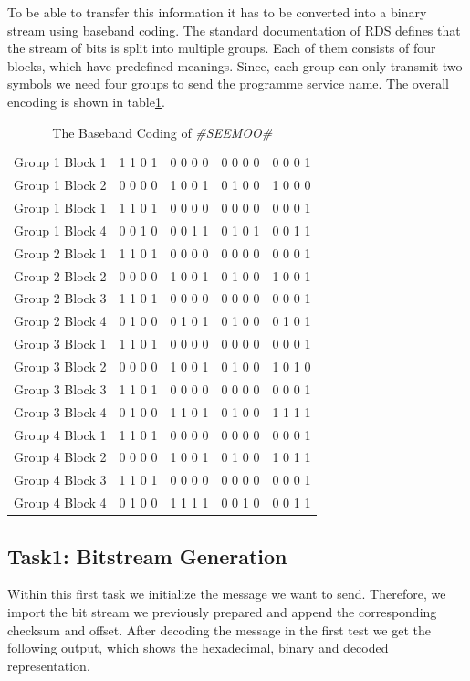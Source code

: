 \documentclass[sigconf]{acmart}
\begin{document}
To be able to transfer this information it has to be converted into a binary stream using baseband
coding. The standard documentation\cite{rds_standard} of RDS defines that the stream of bits is split into
multiple groups. Each of them consists of four blocks, which have predefined meanings. Since, each
group can only transmit two symbols we need four groups to send the programme service name. The
overall encoding is shown in table\ref{tab:baseband_coding}.


\begin{table}[H]
\centering
\begin{tabular}{ l | c | c | c | r}
\hline
Group 1 Block 1 & 1 1 0 1 & 0 0 0 0 & 0 0 0 0 & 0 0 0 1\tabularnewline
Group 1 Block 2 & 0 0 0 0 & 1 0 0 1 & 0 1 0 0 & 1 0 0 0\tabularnewline
Group 1 Block 1 & 1 1 0 1 & 0 0 0 0 & 0 0 0 0 & 0 0 0 1\tabularnewline
Group 1 Block 4 & 0 0 1 0 & 0 0 1 1 & 0 1 0 1 & 0 0 1 1\tabularnewline
Group 2 Block 1 & 1 1 0 1 & 0 0 0 0 & 0 0 0 0 & 0 0 0 1\tabularnewline
Group 2 Block 2 & 0 0 0 0 & 1 0 0 1 & 0 1 0 0 & 1 0 0 1\tabularnewline
Group 2 Block 3 & 1 1 0 1 & 0 0 0 0 & 0 0 0 0 & 0 0 0 1\tabularnewline
Group 2 Block 4 & 0 1 0 0 & 0 1 0 1 & 0 1 0 0 & 0 1 0 1\tabularnewline
Group 3 Block 1 & 1 1 0 1 & 0 0 0 0 & 0 0 0 0 & 0 0 0 1\tabularnewline
Group 3 Block 2 & 0 0 0 0 & 1 0 0 1 & 0 1 0 0 & 1 0 1 0\tabularnewline
Group 3 Block 3 & 1 1 0 1 & 0 0 0 0 & 0 0 0 0 & 0 0 0 1\tabularnewline
Group 3 Block 4 & 0 1 0 0 & 1 1 0 1 & 0 1 0 0 & 1 1 1 1\tabularnewline
Group 4 Block 1 & 1 1 0 1 & 0 0 0 0 & 0 0 0 0 & 0 0 0 1\tabularnewline
Group 4 Block 2 & 0 0 0 0 & 1 0 0 1 & 0 1 0 0 & 1 0 1 1\tabularnewline
Group 4 Block 3 & 1 1 0 1 & 0 0 0 0 & 0 0 0 0 & 0 0 0 1\tabularnewline
Group 4 Block 4 & 0 1 0 0 & 1 1 1 1 & 0 0 1 0 & 0 0 1 1\tabularnewline
\hline
\end{tabular}
\caption{The Baseband Coding of \textit{\#SEEMOO\#}}
\label{tab:baseband_coding}
\end{table}

\hypertarget{Task1:ux20Bitstreamux20Generation}{%
\subsection{Task1: Bitstream
Generation}\label{Task1:ux20Bitstreamux20Generation}}

Within this first task we initialize the message we want to send.
Therefore, we import the bit stream we previously prepared and append
the corresponding checksum and offset. After decoding the message in the
first test we get the following output, which shows the hexadecimal,
binary and decoded representation.
\end{document}
